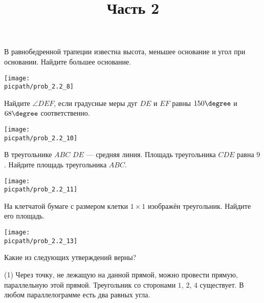\begin{training}[1]
\begin{listofex}[resume]
		\foranswer
		\item \begin{minipage}[t]{\bodywidth}
			В равнобедренной трапеции известна высота, меньшее основание и угол при основании. Найдите большее основание.
			\foranswer
		\end{minipage}
		\gapwidth
		\begin{minipage}[t]{\picwidth}
			\texttt{[image: \\picpath/prob\_2.2\_8]}
		\end{minipage}
		\item \begin{minipage}[t]{\bodywidth}
			Найдите \( \angle DEF \), если градусные меры дуг \( DE \) и \( EF \) равны \( 150\degree \) и \( 68\degree \) соответственно.
			\foranswer
		\end{minipage}
		\gapwidth
		\begin{minipage}[t]{\picwidth}
			\texttt{[image: \\picpath/prob\_2.2\_10]}
		\end{minipage}
		\item \begin{minipage}[t]{\bodywidth}
		В треугольнике \( ABC \) \( DE \) --- средняя линия. Площадь треугольника \( CDE \) равна \( 9 \). Найдите площадь треугольника \( ABC \).
			\foranswer
		\end{minipage}
		\gapwidth
		\begin{minipage}[t]{\picwidth}
			\texttt{[image: \\picpath/prob\_2.2\_11]}
		\end{minipage}
		\item \begin{minipage}[t]{\bodywidth}
			На клетчатой бумаге с размером клетки \( 1\times1 \) изображён треугольник. Найдите его площадь.
			\foranswer
		\end{minipage}
		\gapwidth
		\begin{minipage}[t]{\picwidth}
			\texttt{[image: \\picpath/prob\_2.2\_13]}
		\end{minipage}
		\item Какие из следующих утверждений верны?
		\begin{tasks}(1)
			\task Через точку, не лежащую на данной прямой, можно провести прямую, параллельную этой
			 прямой.
			 \task Треугольник со сторонами \( 1 \), \( 2 \), \( 4 \) существует.
			 \task В любом параллелограмме есть два равных угла.
		\end{tasks}
		\foranswer
		\title{Часть 2}

\end{listofex}
\end{training}
